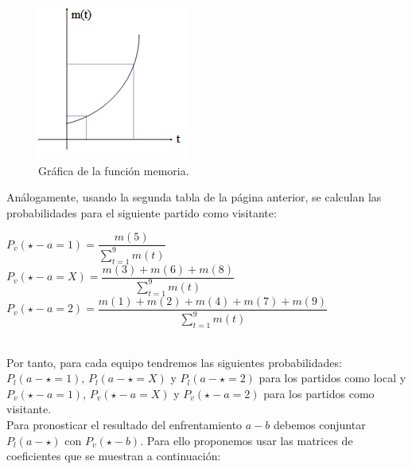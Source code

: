 \begin{figure}[H]
	\centering
	\includegraphics{images/memoria.jpg}
	\caption{Gráfica de la función memoria.} \label{fig:memoria}
\end{figure}
\newpage
Análogamente, usando la segunda tabla de la página anterior, se calculan las probabilidades para el siguiente partido como visitante:
\begin{center}
	$P_{v}(\star - a=1)=\dfrac{m(5)}{\sum_{t=1}^{9}m(t)}$ \ \ \ \
	$P_{v}(\star - a=X)=\dfrac{m(3)+m(6)+m(8)}{\sum_{t=1}^{9}m(t)}$\\
	$P_{v}(\star - a=2)=\dfrac{m(1)+m(2)+m(4)+m(7)+m(9)}{\sum_{t=1}^{9}m(t)}$
\end{center}
\ \\
Por tanto, para cada equipo tendremos las siguientes probabilidades:\\
$P_{l}(a - \star=1)$, $P_{l}(a - \star=X)$ y $P_{l}(a - \star=2)$ para los partidos como local y\\
$P_{v}(\star - a=1)$, $P_{v}(\star - a=X)$ y $P_{v}(\star - a=2)$ para los partidos como visitante.\\

Para pronosticar el resultado del enfrentamiento $a-b$ debemos conjuntar $P_{l}(a - \star)$ con $P_{v}(\star - b)$. Para ello proponemos usar las matrices de coeficientes que se muestran a continuación:

